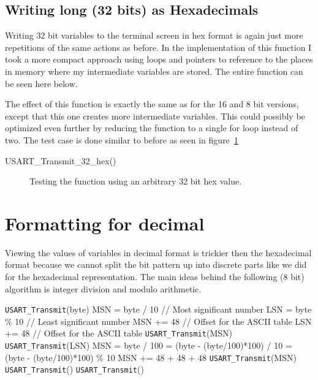 \documentclass[11pt,a4paper,titlepage]{article}
\begin{document}
		\subsection{Writing long (32 bits) as Hexadecimals}
		
		Writing 32 bit variables to the terminal screen in hex format is again just more repetitions of the same actions as before. In the implementation of this function I took a more compact approach using loops and pointers to reference to the places in memory where my intermediate variables are stored. The entire function can be seen here below.
		
		
		
		\noindent The effect of this function is exactly the same as for the 16 and 8 bit versions, except that this one creates more intermediate variables. This could possibly be optimized even further by reducing the function to a single for loop instead of two. The test case is done similar to before as seen in figure~\ref{fig:32bitsend}
		
		\begin{verbbox}
			USART_Transmit_32_hex()
		\end{verbbox}
		\begin{figure}[h]
			\centering
			\caption{Testing the function \theverbbox using an arbitrary 32 bit hex value.}
			\label{fig:32bitsend}
		\end{figure}


	
	\pagebreak
	\section{Formatting for decimal}
	Viewing the values of variables in decimal format is trickier then the hexadecimal format because we cannot split the bit pattern up into discrete parts like we did for the hexadecimal representation. The main ideas behind the following (8 bit) algorithm is integer division and modulo arithmetic.
	\vspace{3mm}
			\begin{algorithmic}
					\State \verb|USART_Transmit|(byte)
					\State MSN = byte / 10 // Most significant number
					\State LSN = byte \% 10 //  Least significant number
					\State MSN += 48	// Offset for the ASCII table
					\State LSN += 48	// Offset for the ASCII table
					\State \verb|USART_Transmit|(MSN)
					\State \verb|USART_Transmit|(LSN)
					\State MSN = byte / 100
					\State {} = (byte - (byte/100)*100) / 10
					\State {} = (byte - (byte/100)*100) \% 10
					\State MSN += 48
					\State {} + 48
					\State {} + 48
					\State \verb|USART_Transmit|(MSN)
					\State \verb|USART_Transmit|()
					\State \verb|USART_Transmit|()
				\EndIf
			\end{algorithmic}
\end{document}
